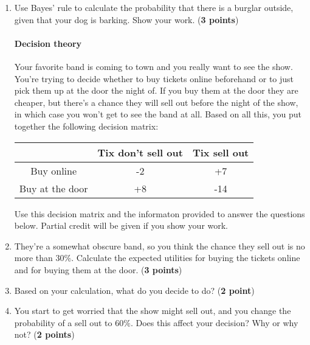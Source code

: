 \documentclass[10pt]{article}
\begin{document}
\begin{enumerate}

\item Use Bayes' rule to calculate the probability that there is a burglar outside, given that your dog is barking. Show your work. (\textbf{3 points})


\vspace{2cm}

\paragraph{Decision theory}

Your favorite band is coming to town and you really want to see the show. You're trying to decide whether to buy tickets online beforehand or to just pick them up at the door the night of. If you buy them at the door they are cheaper, but there's a chance they will sell out before the night of the show, in which case you won't get to see the band at all. Based on all this, you put together the following decision matrix:

\begin{center}
 \begin{tabular}{c|c|c|}
 & Tix don't sell out & Tix sell out \\ \hline
Buy online & -2 & +7 \\ \hline
Buy at the door & +8 & -14 \\ \hline
\end{tabular}
\end{center}

Use this decision matrix and the informaton provided to answer the questions below. Partial credit will be given if you show your work.

\setlength\itemsep{1.5cm}

\item They're a somewhat obscure band, so you think the chance they sell out is no more than $30\%$. Calculate the expected utilities for buying the tickets online and for buying them at the door. (\textbf{3 points})\label{eus}

\item Based on your calculation, what do you decide to do? (\textbf{2 point})

\item You start to get worried that the show might sell out, and you change the probability of a sell out to $60\%$.  Does this affect your decision? Why or why not? (\textbf{2 points})\label{sellout} 


\end{enumerate}
\end{document}
